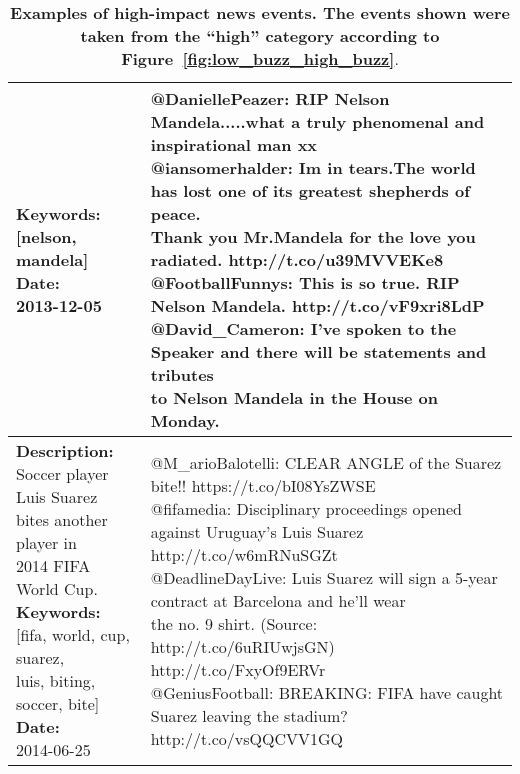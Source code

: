 \begin{table}
{\begin{tabular*}{1\linewidth}{p{5cm}p{5cm}}
{        \textbf{Keywords:}\\ {[}nelson, mandela{]}\vspace{.1cm}\\
        \textbf{Date:}\\ 2013-12-05}
      & \pbox{20cm}{
        @DaniellePeazer: RIP Nelson Mandela.....what a truly phenomenal and inspirational man xx\vspace{.1cm}\\
        @iansomerhalder: Im in tears.The world has lost one of its greatest shepherds of peace.\\Thank you Mr.Mandela for the love you radiated. http://t.co/u39MVVEKe8\vspace{.1cm}\\
        @FootballFunnys: This is so true. RIP Nelson Mandela. http://t.co/vF9xri8LdP\vspace{.1cm}\\
        @David\_Cameron: I've spoken to the Speaker and there will be statements and tributes \\to Nelson Mandela in the House on Monday.} \\
      \hline
      \pbox{20cm}{\textbf{Description:}\\ Soccer player Luis Suarez\\ bites another player in\\ 2014 FIFA World Cup. \vspace{.1cm}\\
        \textbf{Keywords:}\\ {[}fifa, world, cup, suarez,\\ luis, biting, soccer, bite{]}\vspace{.1cm}\\
        \textbf{Date:}\\ 2014-06-25}
      & \pbox{20cm}{
        @M\_arioBalotelli: CLEAR ANGLE of the Suarez bite!!  https://t.co/bI08YsZWSE\vspace{.1cm}\\
        @fifamedia: Disciplinary proceedings opened against Uruguay's Luis Suarez\\ http://t.co/w6mRNuSGZt\vspace{.1cm}\\
        @DeadlineDayLive: Luis Suarez will sign a 5-year contract at Barcelona and he'll wear \\the no. 9 shirt. (Source: http://t.co/6uRIUwjsGN) http://t.co/FxyOf9ERVr\vspace{.1cm}\\
        @GeniusFootball: BREAKING: FIFA have caught Suarez leaving the stadium?\\ http://t.co/vsQQCVV1GQ} \\
      \hline
    \end{tabular*}
  }
  \caption{\textbf{Examples of high-impact news events. The events
      shown were taken from the ``high'' category according to Figure~\ref{fig:low_buzz_high_buzz}}.}
  \label{table:high-impact-sample}
\end{table}

